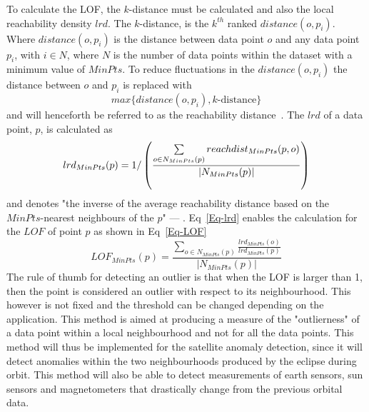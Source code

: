 To calculate the LOF, the $k$-distance must be calculated and also the local reachability density \(lrd\). The $k$-distance, is the $k^{th}$ ranked $distance(o,p_i)$. Where $distance(o,p_i)$ is the distance between data point $o$ and any data point $p_i$, with $i \in N$, where $N$ is the number of data points within the dataset with a minimum value of $MinPts$. To reduce fluctuations in the $distance(o,p_i)$ the distance between $o$ and $p_i$ is replaced with 
\begin{equation}
max \{distance(o,p_i), k\text{-distance}\} 
\end{equation}
and will henceforth be referred to as the reachability distance~\cite{breunig2000lof}. The $lrd$ of a data point, $p$, is calculated as 
\begin{equation}
lrd_{MinPts}(p) = 1/\left(\frac{\sum\limits_{o \in N_{MinPts}(p)}^{} reach\-dist_{MinPts}(p,o)}{|N_{MinPts}(p)|}\right)
\label{Eq-lrd}
\end{equation}
and denotes "the inverse of the average reachability distance based on the $MinPts$-nearest neighbours of the $p$" --- \cite{breunig2000lof}. Eq~\ref{Eq-lrd} enables the calculation for the $LOF$ of point $p$ as shown in Eq~\ref{Eq-LOF}
\begin{equation}
LOF_{MinPts}(p) = \frac{\sum\limits_{o \in N_{MinPts}(p)}^{}\frac{lrd_{MinPts}(o)}{lrd_{MinPts}(p)}}{|N_{MinPts}(p)|}
\label{Eq-LOF}
\end{equation}
The rule of thumb for detecting an outlier is that when the LOF is larger than 1, then the point is considered an outlier with respect to its neighbourhood. This however is not fixed and the threshold can be changed depending on the application.
This method is aimed at producing a measure of the "outlierness" of a data point within a local neighbourhood and not for all the data points. This method will thus be implemented for the satellite anomaly detection, since it will detect anomalies within the two neighbourhoods produced by the eclipse during orbit. This method will also be able to detect measurements of earth sensors, sun sensors and magnetometers that drastically change from the previous orbital data. 


